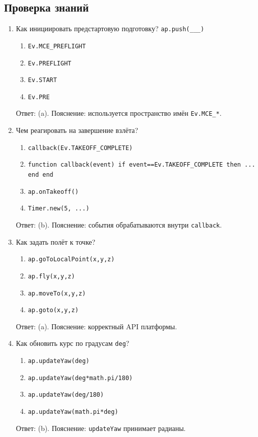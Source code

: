 \subsection{Проверка знаний}
\begin{enumerate}
  \item Как инициировать предстартовую подготовку? \texttt{ap.push(\_\_\_)} 
  \begin{enumerate}[label=(\alph*)] \item \texttt{Ev.MCE\_PREFLIGHT} \item \texttt{Ev.PREFLIGHT} \item \texttt{Ev.START} \item \texttt{Ev.PRE} \end{enumerate}
  Ответ: (a). Пояснение: используется пространство имён \texttt{Ev.MCE\_*}.
  \item Чем реагировать на завершение взлёта? 
  \begin{enumerate}[label=(\alph*)] \item \texttt{callback(Ev.TAKEOFF\_COMPLETE)} \item \texttt{function callback(event) if event==Ev.TAKEOFF\_COMPLETE then ... end end} \item \texttt{ap.onTakeoff()} \item \texttt{Timer.new(5, ...)} \end{enumerate}
  Ответ: (b). Пояснение: события обрабатываются внутри \texttt{callback}.
  \item Как задать полёт к точке? 
  \begin{enumerate}[label=(\alph*)] \item \texttt{ap.goToLocalPoint(x,y,z)} \item \texttt{ap.fly(x,y,z)} \item \texttt{ap.moveTo(x,y,z)} \item \texttt{ap.goto(x,y,z)} \end{enumerate}
  Ответ: (a). Пояснение: корректный API платформы.
  \item Как обновить курс по градусам \texttt{deg}? 
  \begin{enumerate}[label=(\alph*)] \item \texttt{ap.updateYaw(deg)} \item \texttt{ap.updateYaw(deg*math.pi/180)} \item \texttt{ap.updateYaw(deg/180)} \item \texttt{ap.updateYaw(math.pi*deg)} \end{enumerate}
  Ответ: (b). Пояснение: \texttt{updateYaw} принимает радианы.

\end{enumerate}
